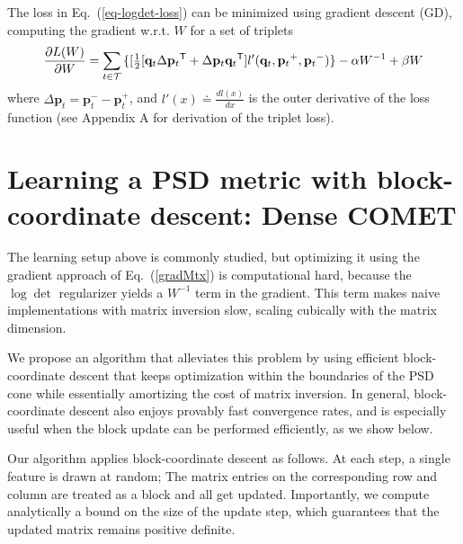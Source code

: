 \documentclass[twoside,11pt]{article}
\newcommand\mat[1]{{#1}}
\renewcommand\vec[1]{\mathbf{#1}}
\newcommand{\T}{{}^\mathsf{T}}
\newcommand{\W}{\mat{W}}
\newcommand{\eqdef}{\doteq}
\newcommand{\q}{{\vec{q}}}
\newcommand{\p}{{\vec{p}}}
\newcommand{\trip}{{t}}
\newcommand{\qt}{{\q_{\trip}}}
\newcommand{\pt}{{\p_{\trip}}}
\newcommand{\triplet}{(\qt, \pt^{+}, \pt^{-})}
\renewcommand{\eqref}[1]{Eq.~(\ref{#1})}
\begin{document}
The loss in \eqref{eq-logdet-loss} can be minimized using gradient descent (GD), computing the gradient w.r.t. $\W$ for a set of triplets
\begin{equation}
  \frac{\partial {L (\W)}}{\partial \W} = \sum\limits_{t\in \cal{T}}{\{
  [\tfrac{1}{2}[\q_{t}\Delta\p_{t}\T + \Delta\p_{t}\q_{t}\T]  }
  {l'}\triplet\} - \alpha \W^{-1} + \beta \W
  \label{gradMtx}
\end{equation}
where $\Delta\p_t = \p_t^- - \p_t^+$, and $l'(x) \eqdef \frac{d{l(x)}}{dx}$ is the outer derivative of the loss function (see Appendix A for derivation of the triplet loss). 

\section{Learning a PSD metric with block-coordinate descent: Dense COMET}

The learning setup above is commonly studied, but 
optimizing it using the gradient approach of \eqref{gradMtx} is computational hard, because the $\log \det$ regularizer yields a $\W^{-1}$ term in the gradient. This term makes naive implementations with matrix inversion slow, scaling cubically with the matrix dimension. 

We propose an algorithm that alleviates this problem by using efficient block-coordinate descent that keeps optimization within the boundaries of the PSD cone while essentially amortizing the cost of matrix inversion.
In general, block-coordinate descent also enjoys provably fast convergence rates, and is especially useful when the block update can be performed efficiently, as we show below.

Our algorithm applies block-coordinate descent as follows. At each step, a single feature is drawn at random; The matrix entries on the corresponding row and column are treated as a block and all get updated. Importantly, we compute analytically a bound on the size of the update step, which guarantees that the updated matrix remains positive definite.
\end{document}
